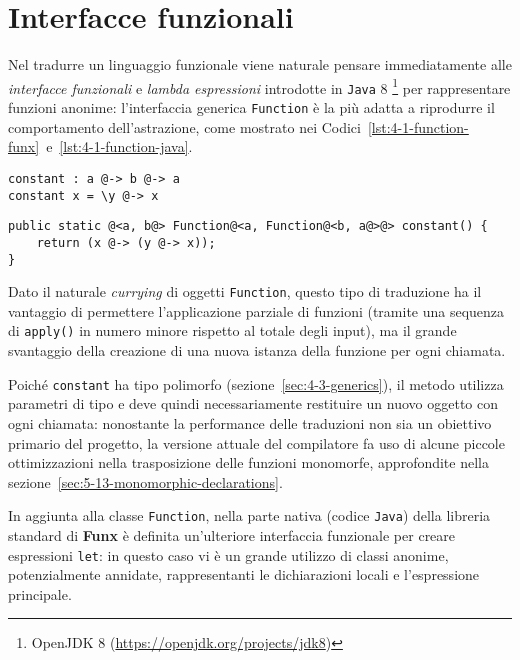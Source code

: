 \section{Interfacce funzionali}
\label{sec:4-1-functional-interfaces}

Nel tradurre un linguaggio funzionale viene naturale pensare immediatamente alle \textit{interfacce funzionali} e \textit{lambda espressioni}
introdotte in \texttt{Java} 8%
\footnote{OpenJDK 8 (\url{https://openjdk.org/projects/jdk8})}
per rappresentare funzioni anonime: l'interfaccia generica \texttt{Function} è la più adatta a riprodurre
il comportamento dell'astrazione, come mostrato nei Codici~\ref{lst:4-1-function-funx}~e~\ref{lst:4-1-function-java}.

\vspace{4mm}
\begin{lstlisting}[caption={Semplice funzione in \textbf{Funx}}, style=funxCode, label={lst:4-1-function-funx}]
constant : a @-> b @-> a
constant x = \y @-> x
\end{lstlisting}
\vspace{4mm}
\begin{lstlisting}[caption={Corrispondente metodo in \texttt{Java}}, style=javaCode, label={lst:4-1-function-java}]
public static @<a, b@> Function@<a, Function@<b, a@>@> constant() {
    return (x @-> (y @-> x));
}
\end{lstlisting}
\vspace{4mm}

\noindent Dato il naturale \textit{currying} di oggetti \texttt{Function}, questo tipo di traduzione ha il vantaggio
di permettere l'applicazione parziale di funzioni (tramite una sequenza di \texttt{apply()} in numero minore rispetto al totale degli input),
ma il grande svantaggio della creazione di una nuova istanza della funzione per ogni chiamata.


Poiché \texttt{constant} ha tipo polimorfo (sezione~\ref{sec:4-3-generics}), il metodo utilizza parametri di tipo
e deve quindi necessariamente restituire un nuovo oggetto con ogni chiamata:
nonostante la performance delle traduzioni non sia un obiettivo primario del progetto, la versione attuale
del compilatore fa uso di alcune piccole ottimizzazioni nella trasposizione delle funzioni monomorfe,
approfondite nella sezione~\ref{sec:5-13-monomorphic-declarations}.

\newpage

\noindent In aggiunta alla classe \texttt{Function}, nella parte nativa (codice \texttt{Java}) della libreria standard
di \textbf{Funx} è definita un'ulteriore interfaccia funzionale per creare espressioni \texttt{let}:
in questo caso vi è un grande utilizzo di classi anonime, potenzialmente annidate,
rappresentanti le dichiarazioni locali e l'espressione principale.


